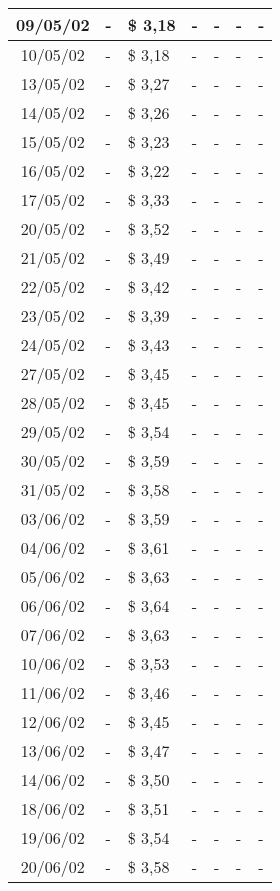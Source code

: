 \begin{center}
\begin{longtable}{|c|p{1.5cm}|p{1.5cm}|p{1.5cm}|p{1.5cm}|p{1.5cm}|p{1.5cm}|}
09/05/02 & - & \$ 3,18 & - & - & - & - \\ \hline
10/05/02 & - & \$ 3,18 & - & - & - & - \\ \hline
13/05/02 & - & \$ 3,27 & - & - & - & - \\ \hline
14/05/02 & - & \$ 3,26 & - & - & - & - \\ \hline
15/05/02 & - & \$ 3,23 & - & - & - & - \\ \hline
16/05/02 & - & \$ 3,22 & - & - & - & - \\ \hline
17/05/02 & - & \$ 3,33 & - & - & - & - \\ \hline
20/05/02 & - & \$ 3,52 & - & - & - & - \\ \hline
21/05/02 & - & \$ 3,49 & - & - & - & - \\ \hline
22/05/02 & - & \$ 3,42 & - & - & - & - \\ \hline
23/05/02 & - & \$ 3,39 & - & - & - & - \\ \hline
24/05/02 & - & \$ 3,43 & - & - & - & - \\ \hline
27/05/02 & - & \$ 3,45 & - & - & - & - \\ \hline
28/05/02 & - & \$ 3,45 & - & - & - & - \\ \hline
29/05/02 & - & \$ 3,54 & - & - & - & - \\ \hline
30/05/02 & - & \$ 3,59 & - & - & - & - \\ \hline
31/05/02 & - & \$ 3,58 & - & - & - & - \\ \hline
03/06/02 & - & \$ 3,59 & - & - & - & - \\ \hline
04/06/02 & - & \$ 3,61 & - & - & - & - \\ \hline
05/06/02 & - & \$ 3,63 & - & - & - & - \\ \hline
06/06/02 & - & \$ 3,64 & - & - & - & - \\ \hline
07/06/02 & - & \$ 3,63 & - & - & - & - \\ \hline
10/06/02 & - & \$ 3,53 & - & - & - & - \\ \hline
11/06/02 & - & \$ 3,46 & - & - & - & - \\ \hline
12/06/02 & - & \$ 3,45 & - & - & - & - \\ \hline
13/06/02 & - & \$ 3,47 & - & - & - & - \\ \hline
14/06/02 & - & \$ 3,50 & - & - & - & - \\ \hline
18/06/02 & - & \$ 3,51 & - & - & - & - \\ \hline
19/06/02 & - & \$ 3,54 & - & - & - & - \\ \hline
20/06/02 & - & \$ 3,58 & - & - & - & - \\ \hline

\end{longtable}
\end{center}
